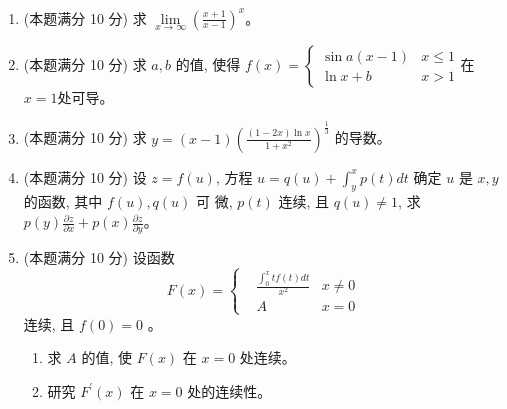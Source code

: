 
\begin{enumerate}
	\item
	(本题满分 10 分)
求 $\lim\limits _{x \rightarrow \infty}\left(\frac{x+1}{x-1}\right)^{x}$。

	

\item
(本题满分 10 分)	
求 $a, b$ 的值, 使得 $f(x)=\left\{\begin{array}{ll}\sin a(x-1) & x \leqslant 1 \\ \ln x+b & x>1\end{array}\right.$在$  x = 1  $处可导。
	



\item
(本题满分 10 分)	
求 $y=(x-1)\left(\frac{(1-2 x) \ln x}{1+x^{2}}\right)^{\frac{1}{3}}$ 的导数。


	

\item
(本题满分 10 分)	
设 $z=f(u)$, 方程 $u=q(u)+\int_{y}^{x} p(t) d t$ 确定 $u$ 是 $x, y$ 的函数, 其中 $f(u), q(u)$ 可 微, $p(t)$ 连续, 且 $q(u) \neq 1$, 求 $p(y) \frac{\partial z}{\partial x}+p(x) \frac{\partial z}{\partial y}$。

	

\item
(本题满分 10 分)	
设函数 
\[ 
	F(x)=\left\{\begin{aligned}
	&\frac{\int_{0}^{x} t f(t) d t}{x^{2}} & x \neq 0 \\
	&A & x=0
\end{aligned}\right.
 \]
 连续, 且 $f(0)=0$ 。
\begin{enumerate}
	\item
	求 $A$ 的值, 使 $F(x)$ 在 $x=0$ 处连续。
	\item 
	研究 $F^{\prime}(x)$ 在 $x=0$ 处的连续性。
	

\end{enumerate}
\end{enumerate}
